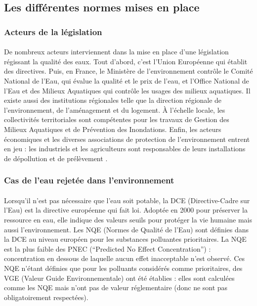 \documentclass{article}
\begin{document}
\subsection{Les différentes normes mises en place}%
\subsubsection{Acteurs de la législation}

\paragraph{} De nombreux acteurs interviennent dans la mise en place d’une législation régissant la qualité des eaux. Tout d’abord, c’est l’Union Européenne qui établit des directives. Puis, en France, le  Ministère de l’environnement contrôle le Comité National de l’Eau, qui évalue la qualité et le prix de l’eau, et l’Office National de l’Eau et des Milieux Aquatiques qui contrôle les usages des milieux aquatiques. Il existe aussi des institutions régionales telle que la direction régionale de l’environnement, de l’aménagement et du logement. À l'échelle locale, les collectivités territoriales sont compétentes pour les travaux de Gestion des Milieux Aquatiques et de Prévention des Inondations. Enfin, les acteurs économiques et les diverses associations de protection de l’environnement entrent en jeu : les industriels et les agriculteurs sont responsables de leurs installations de dépollution et de prélèvement \cite{noauthor_quels_nodate-1}.

\subsubsection{Cas de l’eau rejetée dans l’environnement}
\paragraph{} Lorsqu’il n’est pas nécessaire que l’eau soit potable, la DCE (Directive-Cadre sur l’Eau) est la directive européenne qui fait loi. Adoptée en 2000 pour préserver la ressource en eau, elle indique des valeurs seuils pour protéger la vie humaine mais aussi l’environnement. Les NQE (Normes de Qualité de l’Eau) sont définies dans la DCE au niveau européen pour les substances polluantes prioritaires. La NQE est la plus faible des PNEC (“Predicted No Effect Concentration”) : concentration en dessous de laquelle aucun effet inacceptable n’est observé. Ces NQE n’étant définies que pour les polluants considérés comme prioritaires, des VGE (Valeur Guide Environnementale) ont été établies : elles sont calculées comme les NQE mais n’ont pas de valeur réglementaire (donc ne sont pas obligatoirement respectées).
\end{document}
